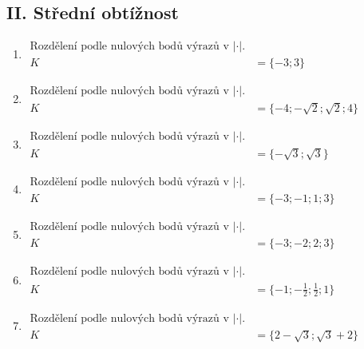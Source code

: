 \documentclass[11pt,a4paper]{article}
\begin{document}
\subsection*{II. Střední obtížnost}
\begin{enumerate}[label={},itemsep=9pt]
\item[\textbf{G001}] \(\displaystyle \begin{aligned}\text{Rozdělení podle nulových bodů výrazů v }|\cdot|.\\ K&=\{-3;3\}\end{aligned}\)\par
\item[\textbf{G002}] \(\displaystyle \begin{aligned}\text{Rozdělení podle nulových bodů výrazů v }|\cdot|.\\ K&=\{-4;- \sqrt{2};\sqrt{2};4\}\end{aligned}\)\par
\item[\textbf{G003}] \(\displaystyle \begin{aligned}\text{Rozdělení podle nulových bodů výrazů v }|\cdot|.\\ K&=\{- \sqrt{3};\sqrt{3}\}\end{aligned}\)\par
\item[\textbf{G004}] \(\displaystyle \begin{aligned}\text{Rozdělení podle nulových bodů výrazů v }|\cdot|.\\ K&=\{-3;-1;1;3\}\end{aligned}\)\par
\item[\textbf{G005}] \(\displaystyle \begin{aligned}\text{Rozdělení podle nulových bodů výrazů v }|\cdot|.\\ K&=\{-3;-2;2;3\}\end{aligned}\)\par
\item[\textbf{G006}] \(\displaystyle \begin{aligned}\text{Rozdělení podle nulových bodů výrazů v }|\cdot|.\\ K&=\{-1;- \frac{1}{2};\frac{1}{2};1\}\end{aligned}\)\par
\item[\textbf{G007}] \(\displaystyle \begin{aligned}\text{Rozdělení podle nulových bodů výrazů v }|\cdot|.\\ K&=\{2 - \sqrt{3};\sqrt{3} + 2\}\end{aligned}\)\par

\end{enumerate}
\end{document}
